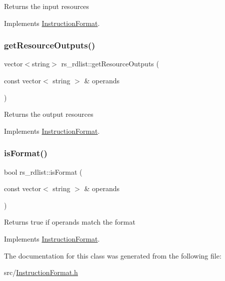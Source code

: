 Returns the input resources 

Implements \hyperlink{classInstructionFormat_a09775d3a3c22f40a0f44504664e586e4}{Instruction\+Format}.

\mbox{\label{classrs__rdlist_acb2773ca764d509fe6acaeaf83064b90}} 
\subsubsection{\texorpdfstring{get\+Resource\+Outputs()}{getResourceOutputs()}}
{\footnotesize\ttfamily vector$<$string$>$ rs\+\_\+rdlist\+::get\+Resource\+Outputs (\begin{DoxyParamCaption}\item[{const vector$<$ string $>$ \&}]{operands }\end{DoxyParamCaption})\hspace{0.3cm}{\ttfamily [virtual]}}

Returns the output resources 

Implements \hyperlink{classInstructionFormat_a95cd28ffb1bde59b67f676880ab10536}{Instruction\+Format}.

\mbox{\label{classrs__rdlist_a3bf959757fd3abfc635485e85471dce4}} 
\subsubsection{\texorpdfstring{is\+Format()}{isFormat()}}
{\footnotesize\ttfamily bool rs\+\_\+rdlist\+::is\+Format (\begin{DoxyParamCaption}\item[{const vector$<$ string $>$ \&}]{operands }\end{DoxyParamCaption})\hspace{0.3cm}{\ttfamily [virtual]}}

Returns true if operands match the format 

Implements \hyperlink{classInstructionFormat_a9fdcf94dcd7d9a55ba86e7a63f04d1fe}{Instruction\+Format}.



The documentation for this class was generated from the following file\+:\begin{DoxyCompactItemize}
\item 
src/\hyperlink{InstructionFormat_8h}{Instruction\+Format.\+h}\end{DoxyCompactItemize}
